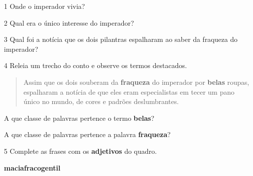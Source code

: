 
\pagebreak
\num{1} Onde o imperador vivia?


\num{2} Qual era o único interesse do imperador?


\num{3} Qual foi a notícia que os dois pilantras espalharam 
ao saber da fraqueza do imperador?


\num{4} Releia um trecho do conto e observe os termos destacados.

\begin{quote}
Assim que os dois souberam da \textbf{fraqueza} do imperador por
\textbf{belas} roupas, espalharam a notícia de que eles eram
especialistas em tecer um pano único no mundo, de cores e padrões
deslumbrantes.
\end{quote}

\begin{escolha}
\item
A que classe de palavras pertence o termo \textbf{belas}?


\item
A que classe de palavras pertence a palavra \textbf{fraqueza}?

\end{escolha}

\num{5} Complete as frases com os \textbf{adjetivos} do quadro.

\begin{mdframed}[linewidth=2pt,linecolor=salmao,roundcorner=10pt]
\textbf{macia}\hfill \textbf{fraco}\hfill \textbf{gentil}\hfill
\end{mdframed}

